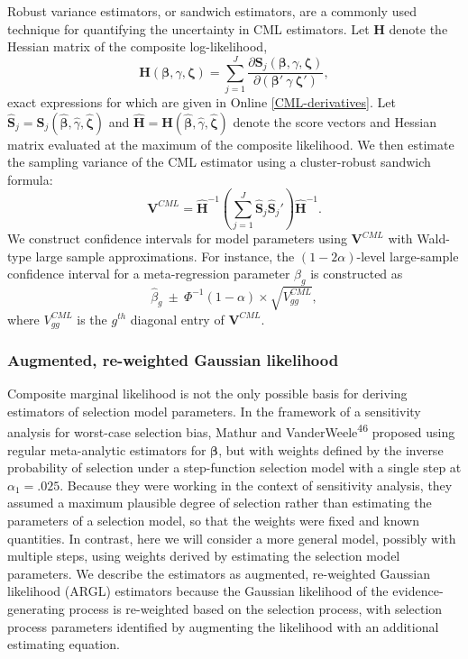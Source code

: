\documentclass[
  american,
  man, donotrepeattitle,floatsintext]{apa7}
\begin{document}
Robust variance estimators, or sandwich estimators, are a commonly used technique for quantifying the uncertainty in CML estimators. Let \(\mathbf{H}\) denote the Hessian matrix of the composite log-likelihood,
\begin{equation}
\mathbf{H}(\boldsymbol\beta, \gamma, \boldsymbol\zeta) = \sum_{j=1}^J \frac{\partial \mathbf{S}_j(\boldsymbol\beta, \gamma, \boldsymbol\zeta)}{\partial \left(\boldsymbol\beta' \ \gamma \ \boldsymbol\zeta'\right)},
\end{equation}
exact expressions for which are given in Online \ref{CML-derivatives}.
Let \(\mathbf{\hat{S}}_j = \mathbf{S}_j(\boldsymbol{\hat\beta}, \hat\gamma, \boldsymbol{\hat\zeta})\) and \(\mathbf{\hat{H}} = \mathbf{H}(\boldsymbol{\hat\beta}, \hat\gamma, \boldsymbol{\hat\zeta})\) denote the score vectors and Hessian matrix evaluated at the maximum of the composite likelihood.
We then estimate the sampling variance of the CML estimator using a cluster-robust sandwich formula:
\begin{equation}
\label{eq:sandwich-variance}
\mathbf{V}^{CML} = \mathbf{\hat{H}}^{-1}\left(\sum_{j=1}^J \mathbf{\hat{S}}_j {\mathbf{\hat{S}}_j}'\right) \mathbf{\hat{H}}^{-1}.
\end{equation}
We construct confidence intervals for model parameters using \(\mathbf{V}^{CML}\) with Wald-type large sample approximations. For instance, the \((1 - 2\alpha)\)-level large-sample confidence interval for a meta-regression parameter \(\beta_g\) is constructed as
\[
\hat\beta_g \ \pm \ \Phi^{-1}(1 - \alpha) \times \sqrt{V^{CML}_{gg}},
\]
where \(V^{CML}_{gg}\) is the \(g^{th}\) diagonal entry of \(\mathbf{V}^{CML}\).

\subsubsection{Augmented, re-weighted Gaussian likelihood}\label{augmented-re-weighted-gaussian-likelihood}

Composite marginal likelihood is not the only possible basis for deriving estimators of selection model parameters.
In the framework of a sensitivity analysis for worst-case selection bias, Mathur and VanderWeele\textsuperscript{46} proposed using regular meta-analytic estimators for \(\boldsymbol\beta\), but with weights defined by the inverse probability of selection under a step-function selection model with a single step at \(\alpha_1 = .025\).
Because they were working in the context of sensitivity analysis, they assumed a maximum plausible degree of selection rather than estimating the parameters of a selection model, so that the weights were fixed and known quantities.
In contrast, here we will consider a more general model, possibly with multiple steps, using weights derived by estimating the selection model parameters.
We describe the estimators as augmented, re-weighted Gaussian likelihood (ARGL) estimators because the Gaussian likelihood of the evidence-generating process is re-weighted based on the selection process, with selection process parameters identified by augmenting the likelihood with an additional estimating equation.
\end{document}

